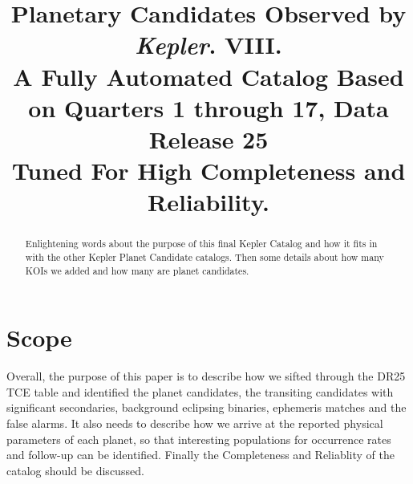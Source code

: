 \documentclass[onecolumn]{aastex6}
\newcommand\Kepler{\textit{Kepler}}
\begin{document}

\title{Planetary Candidates Observed by \Kepler. VIII.\\
A Fully Automated Catalog Based on Quarters 1 through 17, Data Release 25\\Tuned For High Completeness and Reliability. }



\begin{abstract}
Enlightening words about the purpose of this final Kepler Catalog and how it fits in with the other Kepler Planet Candidate catalogs. Then some details about how many KOIs we added and how many are planet candidates. 
\end{abstract}


\section{Scope}
Overall, the purpose of this paper is to describe how we sifted through the DR25 TCE table and identified the planet candidates, the transiting candidates with significant secondaries, background eclipsing binaries, ephemeris matches and the false alarms. It also needs to describe how we arrive at the reported physical parameters of each planet, so that interesting populations for occurrence rates and follow-up can be identified.  Finally the Completeness and Reliablity of the catalog should be discussed.
\end{document}
